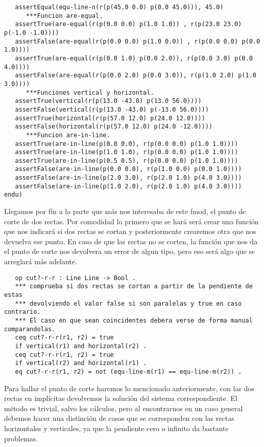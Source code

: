 {\begin{verbatim}
   assertEqual(equ-line-n(r(p(45.0 0.0) p(0.0 45.0))), 45.0)
      ***Funcion are-equal.
   assertTrue(are-equal(r(p(0.0 0.0) p(1.0 1.0)) , r(p(23.0 23.0) p(-1.0 -1.0))))
   assertFalse(are-equal(r(p(0.0 0.0) p(1.0 0.0)) , r(p(0.0 0.0) p(0.0 1.0))))
   assertTrue(are-equal(r(p(0.0 1.0) p(0.0 2.0)), r(p(0.0 3.0) p(0.0 4.0))))
   assertFalse(are-equal(r(p(0.0 2.0) p(0.0 3.0)), r(p(1.0 2.0) p(1.0 3.0))))
      ***Funciones vertical y horizontal.
   assertTrue(vertical(r(p(13.0 -43.0) p(13.0 56.0))))
   assertFalse(vertical(r(p(13.0 -43.0) p(-13.0 56.0))))
   assertTrue(horizontal(r(p(57.0 12.0) p(24.0 12.0))))
   assertFalse(horizontal(r(p(57.0 12.0) p(24.0 -12.0))))
      ***Funcion are-in-line.
   assertTrue(are-in-line(p(0.0 0.0), r(p(0.0 0.0) p(1.0 1.0))))
   assertTrue(are-in-line(p(1.0 1.0), r(p(0.0 0.0) p(1.0 1.0))))
   assertTrue(are-in-line(p(0.5 0.5), r(p(0.0 0.0) p(1.0 1.0))))
   assertFalse(are-in-line(p(0.0 0.0), r(p(1.0 0.0) p(0.0 1.0))))
   assertFalse(are-in-line(p(2.0 3.0), r(p(2.0 1.0) p(4.0 3.0))))
   assertFalse(are-in-line(p(1.0 2.0), r(p(2.0 1.0) p(4.0 3.0))))
endu)
\end{verbatim}
}

Llegamos por fín a la parte que más nos interesaba de este fmod, el punto de corte de dos rectas.
Por comodidad lo primero que se hará será crear una función que nos indicará si dos rectas se cortan y
posteriormente crearemos otra que nos devuelva ese punto. En caso de que las rectas no se corten, la función que nos da el punto de corte nos devolvera un error de algun tipo, pero eso será algo que se arreglará más adelante. \par

{\codesize
\begin{verbatim}	
   op cut?-r-r : Line Line -> Bool .
   *** comprueba si dos rectas se cortan a partir de la pendiente de estas
   *** devolviendo el valor false si son paralelas y true en caso contrario.
   *** El caso en que sean coincidentes debera verse de forma manual comparandolas.
   ceq cut?-r-r(r1, r2) = true 
   if vertical(r1) and horizontal(r2) .
   ceq cut?-r-r(r1, r2) = true 
   if vertical(r2) and horizontal(r1) .
   eq cut?-r-r(r1, r2) = not (equ-line-m(r1) == equ-line-m(r2)) .
\end{verbatim}
}

Para hallar el punto de corte haremos lo mencionado anteriormente, con las dos rectas en implícitas devolvemos la solución del sistema correspondiente. El método es trivial, salvo los cálculos, pero al encontrarnos en un caso general debemos hacer una distinción de casos que se corresponden con las rectas horizontales y verticales, ya que la pendiente cero o infinito da bastante problemas. \par

